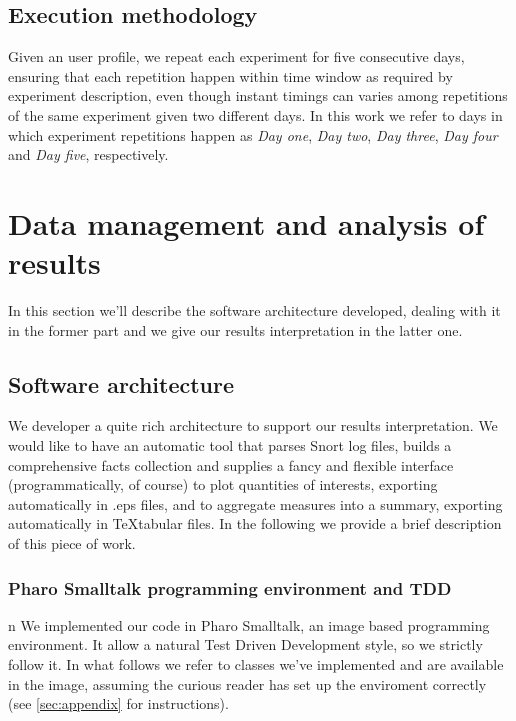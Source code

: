 \documentclass[10pt,a4paper]{article}
\begin{document}
    \subsection{Execution methodology}

    Given an user profile, we repeat each experiment for five
    consecutive days, ensuring that each repetition happen within time
    window as required by experiment description, even though instant
    timings can varies among repetitions of the same experiment given
    two different days. In this work we refer to days in which
    experiment repetitions happen as \emph{Day one}, \emph{Day two},
    \emph{Day three}, \emph{Day four} and \emph{Day five},
    respectively.

    \newpage
    \section{Data management and analysis of results}
    \label{sec:data-management-result-analysis}

    In this section we'll describe the software architecture
    developed, dealing with it in the former part and we give our
    results interpretation in the latter one.

    \subsection{Software architecture}
    We developer a quite rich architecture to support our results
    interpretation. We would like to have an automatic tool that
    parses Snort log files, builds a comprehensive facts collection
    and supplies a fancy and flexible interface (programmatically, of
    course) to plot quantities of interests, exporting automatically
    in .eps files, and to aggregate measures into a summary, exporting
    automatically in \TeX tabular files. In the following we provide a
    brief description of this piece of work.

    \subsubsection{Pharo Smalltalk programming environment and TDD}
    n
    We implemented our code in Pharo Smalltalk, an image based
    programming environment. It allow a natural Test Driven
    Development style, so we strictly follow it. In what follows we
    refer to classes we've implemented and are available in the image,
    assuming the curious reader has set up the enviroment correctly
    (see \autoref{sec:appendix} for instructions).
\end{document}
